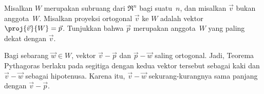 \begin{exercises}
\item Misalkan $W$ merupakan subruang dari $\Re^n$ bagi suatu~$n$, dan misalkan
  $\vec{v}$ bukan anggota~$W$.
  Misalkan proyeksi ortogonal $\vec{v}$ ke $W$ adalah vektor
  $\proj{\vec{v}}{W}=\vec{p}$.
  Tunjukkan bahwa $\vec{p}$ merupakan anggota~$W$ yang paling dekat dengan
  $\vec{v}$.
  \begin{answer}
    Bagi sebarang $\vec{w}\in W$, vektor $\vec{v}-\vec{p}$ dan
    $\vec{p}-\vec{w}$ saling ortogonal.
    Jadi, Teorema Pythagoras berlaku pada segitiga dengan kedua vektor tersebut
    sebagai kaki dan $\vec{v}-\vec{w}$ sebagai hipotenusa.
    Karena itu, $\vec{v}-\vec{w}$ sekurang-kurangnya sama panjang dengan
    $\vec{v}-\vec{p}$.
  \end{answer}

   





\end{exercises}
